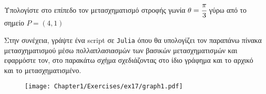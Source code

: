 \begin{exercise}
Υπολογίστε στο επίπεδο τον μετασχηματισμό στροφής γωνία $\theta = \cfrac{\pi}{3}$ γύρω από το σημείο $P = (4,1)$

Στην συνέχεια, γράψτε ένα script σε \texttt{Julia} όπου θα υπολογίζει τον παραπάνω πίνακα μετασχηματισμού μέσω πολλαπλασιασμών των βασικών μετασχηματισμών και εφαρμόστε τον, στο παρακάτω σχήμα  σχεδιάζοντας στο ίδιο γράφημα και το αρχικό και το μετασχηματισμένο.

\begin{figure}[hbt]
  \begin{center}
	\texttt{[image: Chapter1/Exercises/ex17/graph1.pdf]}
  \end{center}
\end{figure}

\end{exercise}
